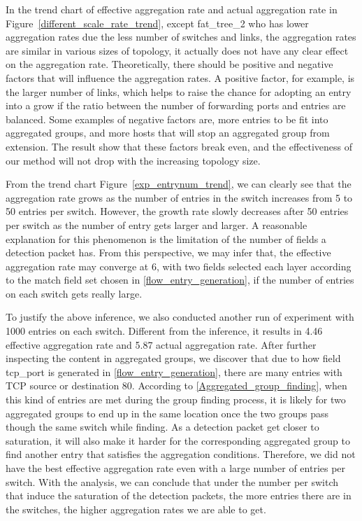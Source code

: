 In the trend chart of effective aggregation rate and actual aggregation rate in Figure~\ref{different_scale_rate_trend}, except fat\_tree\_2 who has lower aggregation rates due the less number of switches and links, the aggregation rates are similar in various sizes of topology, it actually does not have any clear effect on the aggregation rate. Theoretically, there should be positive and negative factors that will influence the aggregation rates. A positive factor, for example, is the larger number of links, which helps to raise the chance for adopting an entry into a grow  if the ratio between the number of forwarding ports and entries are balanced. Some examples of negative factors are, more entries to be fit into aggregated groups, and more hosts that will stop an aggregated group from extension. The result show that these factors break even, and the effectiveness of our method will not drop with the increasing topology size.

From the trend chart Figure~\ref{exp_entrynum_trend}, we can clearly see that the aggregation rate grows as the number of entries in the switch increases from 5 to 50 entries per switch. However, the growth rate slowly decreases after 50 entries per switch as the number of entry gets larger and larger. A reasonable explanation for this phenomenon is the limitation of the number of fields a detection packet has. From this perspective, we may infer that, the effective aggregation rate may converge at 6, with two fields selected each layer according to the match field set chosen in \ref{flow_entry_generation}, if the number of entries on each switch gets really large.

To justify the above inference, we also conducted another run of experiment with 1000 entries on each switch. Different from the inference, it results in 4.46 effective aggregation rate and 5.87 actual aggregation rate. After further inspecting the content in aggregated groups, we discover that due to how field tcp\_port is generated in \ref{flow_entry_generation}, there are many entries with TCP source or destination 80. According to \ref{Aggregated_group_finding}, when this kind of entries are met during the group finding process, it is likely for two aggregated groups to end up in the same location once the two groups pass though the same switch while finding. As a detection packet get closer to saturation, it will also make it harder for the corresponding aggregated group to find another entry that satisfies the aggregation conditions. Therefore, we did not have the best effective aggregation rate even with a large number of entries per switch. With the analysis, we can conclude that under the number per switch that induce the saturation of the detection packets, the more entries there are in the switches, the higher aggregation rates we are able to get.